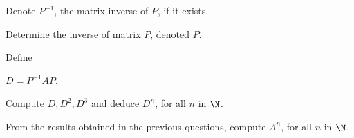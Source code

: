 % 
 
% 







 
 
Denote  $P^{-1}$, the matrix inverse of $P$, if it exists.
 

\ben

\item 
 
 
Determine the inverse of matrix $P$, denoted $P$.
 



\item
 
 
Define
 
$D=P^{-1}AP$. 
%
%
 
 
Compute $D, D^{2}, D^{3}$ and deduce $D^{n}$, for all $n$ in $\N$.
 


\item
 
 
From the results obtained in the previous questions, compute  $A^{n}$, for all $n$ in $\N$.
 


 


\een







